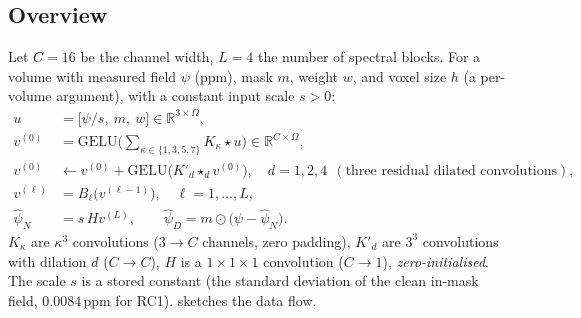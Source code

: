 \documentclass[11pt]{article}
\newcommand{\R}{\mathbb{R}}
\newcommand{\GELU}{\mathrm{GELU}}
\theoremstyle{remark}
\begin{document}
\subsection{Overview}
Let $C=16$ be the channel width, $L=4$ the number of spectral blocks. For a volume with measured field $\psi$ (ppm), mask $m$, weight $w$, and voxel size $h$ (a per-volume argument), with a constant input scale $s>0$:
\begin{align}
u&=\big[\psi/s,\ m,\ w\big]\in\R^{3\times\Omega}, \label{eq:input}\\
v^{(0)}&=\GELU\Big(\sum_{\kappa\in\{1,3,5,7\}}K_\kappa\star u\Big)\in\R^{C\times\Omega}, \label{eq:lift}\\
v^{(0)}&\leftarrow v^{(0)}+\GELU\big(K'_d\star_d v^{(0)}\big),\quad d=1,2,4 \ \ (\text{three residual dilated convolutions}), \label{eq:spatial}\\
v^{(\ell)}&=B_\ell\big(v^{(\ell-1)}\big),\quad\ell=1,\dots,L, \label{eq:blocks}\\
\widehat\psi_N&=s\,H v^{(L)},\qquad \widehat\psi_D=m\odot\big(\psi-\widehat\psi_N\big). \label{eq:head}
\end{align}
$K_\kappa$ are $\kappa^3$ convolutions ($3\to C$ channels, zero padding), $K'_d$ are $3^3$ convolutions with dilation $d$ ($C\to C$), $H$ is a $1\times1\times1$ convolution ($C\to1$), \emph{zero-initialised}. The scale $s$ is a stored constant (the standard deviation of the clean in-mask field, $0.0084$\,ppm for RC1).
 sketches the data flow.
\end{document}
